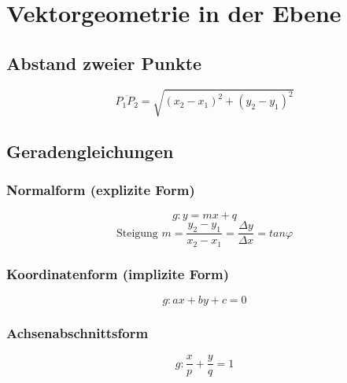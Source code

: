 



\section{Vektorgeometrie in der Ebene}

\subsection{Abstand zweier Punkte}
\[ \boxed{ \overline{P_1 P_2} = \sqrt{ (x_2 - x_1)^2 + (y_2 - y_1)^2 } } \]

\subsection{Geradengleichungen}

\subsubsection{Normalform (explizite Form)}
\[ \boxed{ g: y= mx + q }\]
\[ \boxed{ \text{Steigung } m = \frac{y_2 - y_1}{x_2 - x_1} 
= \frac{\Delta y}{\Delta x}  = tan \varphi } \]

\subsubsection{Koordinatenform (implizite Form)}
\[ \boxed{ g: ax + by + c = 0 } \]

\subsubsection{Achsenabschnittsform}
\[ \boxed{ g: \frac{x}{p} + \frac{y}{q} = 1 } \]

